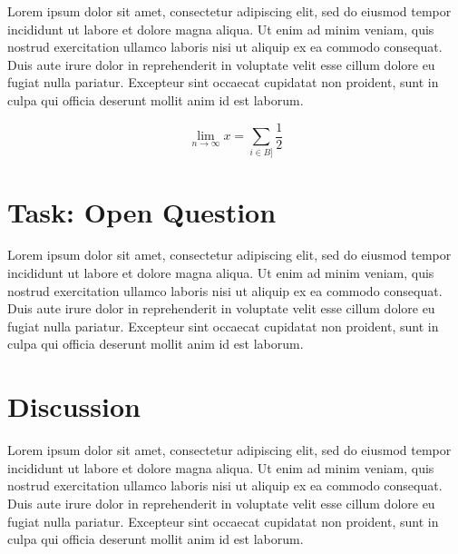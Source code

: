 \documentclass[sigchi]{acmart}
\begin{document}
Lorem ipsum dolor sit amet, consectetur adipiscing elit, sed do eiusmod tempor incididunt ut labore et dolore magna aliqua. Ut enim ad minim veniam, quis nostrud exercitation ullamco laboris nisi ut aliquip ex ea commodo consequat. Duis aute irure dolor in reprehenderit in voluptate velit esse cillum dolore eu fugiat nulla pariatur. Excepteur sint occaecat cupidatat non proident, sunt in culpa qui officia deserunt mollit anim id est laborum.

\begin{equation}
  \lim_{n\rightarrow \infty}x= \sum_{i\in B]}\frac{1}{2}
\end{equation}


\section{Task: Open Question}

Lorem ipsum dolor sit amet, consectetur adipiscing elit, sed do eiusmod tempor incididunt ut labore et dolore magna aliqua. Ut enim ad minim veniam, quis nostrud exercitation ullamco laboris nisi ut aliquip ex ea commodo consequat. Duis aute irure dolor in reprehenderit in voluptate velit esse cillum dolore eu fugiat nulla pariatur. Excepteur sint occaecat cupidatat non proident, sunt in culpa qui officia deserunt mollit anim id est laborum.

\section{Discussion}

Lorem ipsum dolor sit amet, consectetur adipiscing elit, sed do eiusmod tempor incididunt ut labore et dolore magna aliqua. Ut enim ad minim veniam, quis nostrud exercitation ullamco laboris nisi ut aliquip ex ea commodo consequat. Duis aute irure dolor in reprehenderit in voluptate velit esse cillum dolore eu fugiat nulla pariatur. Excepteur sint occaecat cupidatat non proident, sunt in culpa qui officia deserunt mollit anim id est laborum.



\end{document}
